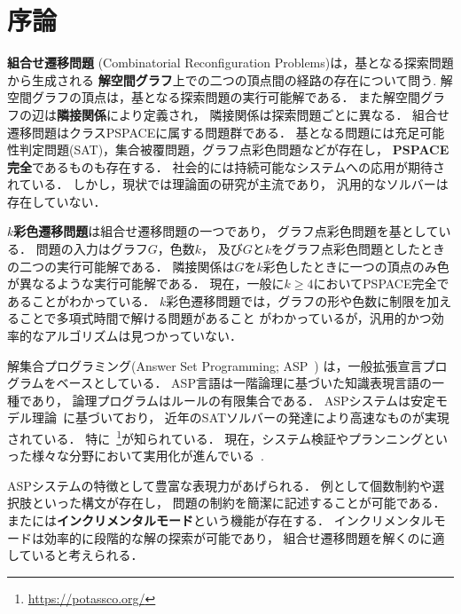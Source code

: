 \chapter{序論} \label{chap:introduction}


\textbf{組合せ遷移問題} (Combinatorial Reconfiguration Problems)は，基となる探索問題から生成される
\textbf{解空間グラフ}上での二つの頂点間の経路の存在について問う.
解空間グラフの頂点は，基となる探索問題の実行可能解である．
また解空間グラフの辺は\textbf{隣接関係}により定義され，
隣接関係は探索問題ごとに異なる．
組合せ遷移問題はクラスPSPACEに属する問題群である．
基となる問題には充足可能性判定問題(SAT)，集合被覆問題，グラフ点彩色問題などが存在し，
\textbf{PSPACE完全}であるものも存在する．
社会的には持続可能なシステムへの応用が期待されている．
しかし，現状では理論面の研究が主流であり，
汎用的なソルバーは存在していない．

\textbf{$k$彩色遷移問題}は組合せ遷移問題の一つであり，
グラフ点彩色問題を基としている．
問題の入力はグラフ$G$，色数$k$，
及び$G$と$k$をグラフ点彩色問題としたときの二つの実行可能解である．
隣接関係は$G$を$k$彩色したときに一つの頂点のみ色が異なるような実行可能解である．
現在，一般に$k \ge 4$においてPSPACE完全であることがわかっている．
$k$彩色遷移問題では，グラフの形や色数に制限を加えることで多項式時間で解ける問題があること
がわかっているが，汎用的かつ効率的なアルゴリズムは見つかっていない．

解集合プログラミング(Answer Set Programming; ASP~\cite{%
Baral03:cambridge,%
Gelfond88:iclp,%
Inoue08:jssst,%
Niemela99:amai})
は，一般拡張宣言プログラムをベースとしている．
ASP言語は一階論理に基づいた知識表現言語の一種であり，
論理プログラムはルールの有限集合である．
ASPシステムは安定モデル理論~\cite{Gelfond88:iclp}に基づいており，
近年のSATソルバーの発達により高速なものが実現されている．
特に{\clingo}~\footnote{\url{https://potassco.org/}}が知られている．
現在，システム検証やプランニングといった様々な分野において実用化が進んでいる~\cite{Erdem16:AI}.

ASPシステムの特徴として豊富な表現力があげられる．
例として個数制約や選択肢といった構文が存在し，
問題の制約を簡潔に記述することが可能である．
また{\clingo}には\textbf{インクリメンタルモード}という機能が存在する．
インクリメンタルモードは効率的に段階的な解の探索が可能であり，
組合せ遷移問題を解くのに適していると考えられる．

